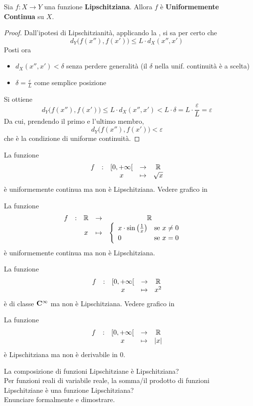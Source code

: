 \begin{proposition}
	\label{prop:se_lips_allora_unif_cont}
	Sia $f: X \to Y$ una funzione \textbf{Lipschitziana}. Allora $f$ è \textbf{Uniformemente Continua} su $X$.
	\begin{proof}
		Dall'ipotesi di Lipschitzianità, applicando la , si sa per certo che
		\[d_Y\bigl(f(x''),f(x')\bigr) \leq L \cdot d_X(x'',x')\]
		Posti ora
		\begin{itemize}
			\item $d_X(x'',x') < \delta$ senza perdere generalità (il $\delta$ nella unif. continuità è a scelta)
			\item $\delta = \frac{\varepsilon}{L}$ come semplice posizione
		\end{itemize}
		Si ottiene
		\[d_Y\bigl(f(x''),f(x')\bigr) \leq L \cdot d_X(x'',x') < L \cdot \delta = L \cdot \frac{\varepsilon}{L} = \varepsilon\]
		Da cui, prendendo il primo e l'ultimo membro,
		\[d_Y\bigl(f(x''),f(x')\bigr) < \varepsilon\]
		che è la condizione di uniforme continuità.
	\end{proof}
\end{proposition}
\begin{example}
	La funzione
	\[\begin{array}{ccccc} {f} & : & {\left[0,+\infty\right[} & \to & {\mathbb{R}} \\ & & {x} & \mapsto & {\sqrt{x}} \\ \end{array}\]
	è uniformemente continua ma non è Lipschitziana. Vedere grafico in 
\end{example}
\begin{example}
	La funzione
	\[\begin{array}{ccccc} {f} & : & {\mathbb{R}} & \to & {\mathbb{R}} \\ & & {x} & \mapsto & {\begin{cases}
		\begin{array}{ll}
			x \cdot \sin \left(\frac{1}{x}\right) & \text{se } x \neq 0\\
			0 & \text{se } x = 0\\
		\end{array}
	\end{cases}} \\ \end{array}\]
	è uniformemente continua ma non è Lipschitziana.
\end{example}
\begin{example}
	La funzione
	\[\begin{array}{ccccc} {f} & : & {\left[0,+\infty\right[} & \to & {\mathbb{R}} \\ & & {x} & \mapsto & {x^2} \\ \end{array}\]
	è di classe $\mathbf{C^{\infty}}$ ma non è Lipschitziana. Vedere grafico in 
\end{example}
\begin{example}
	La funzione
	\[\begin{array}{ccccc} {f} & : & {\left[0,+\infty\right[} & \to & {\mathbb{R}} \\ & & {x} & \mapsto & {\left|x\right|} \\ \end{array}\]
	è Lipschitziana ma non è derivabile in $0$.
\end{example}
\begin{exercise}
	\label{ex:comp_funz_lips}
	La composizione di funzioni Lipschitziane è Lipschitziana?\\
	Per funzioni reali di variabile reale, la somma/il prodotto di funzioni Lipschitziane è una funzione Lipschitziana?\\
	Enunciare formalmente e dimostrare.
\end{exercise}

